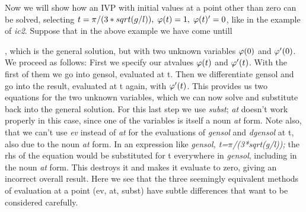 \documentclass[../Maxima_Workbook.tex]{subfiles}
\begin{document}
\lz Now we will show how an IVP with initial values at a point other than zero can be solved, selecting $ t=\pi/(3*sqrt(g/l)), \; \varphi(t)=1, \; \varphi(t)'=0 $, like in the example of \emph{ic2}. Suppose that in the above example we have come untill \begin{small}\end{small}, which is the general solution, but with two unknown variables $ \varphi(0) $ and $ \varphi'(0) $. We proceed as follows: First we specify our atvalues $ \varphi(t) $ and $ \varphi'(t) $. With the first of them we go into gensol, evaluated at t. Then we differentiate gensol and go into the result, evaluated at t again, with $ \varphi'(t) $. This provides us two equations for the two unknown variables, which we can now solve and substitute back into the general solution. For this last step we use \emph{subst}; \emph{at} doesn't work properly in this case, since one of the variables is itself a noun \emph{at} form. Note also, that we can't use \emph{ev} instead of \emph{at} for the evaluations of \emph{gensol} and \emph{dgensol} at t, also due to the noun \emph{at} form. In an expression like \emph{gensol, t=$ \pi $/(3*sqrt(g/l));} the rhs of the equation would be substituted for t everywhere in \emph{gensol}, including in the noun \emph{at} form. This destroys it and makes it evaluate to zero, giving an incorrect overall result. Here we see that the three seemingly equivalent methods of evaluation at a point (ev, at, subst) have subtle differences that want to be considered carefully. 
\end{document}
